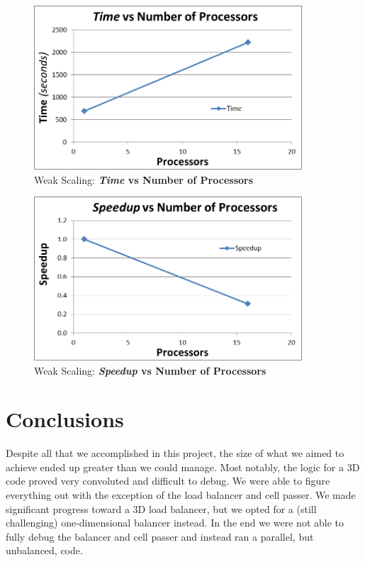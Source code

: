 \documentclass[]{article}
\begin{document}
\begin{figure}[h!]
    \centering
    \includegraphics[width=10cm]{weak_times.png}
    \caption{Weak Scaling: \textbf{\textit{Time} vs Number of Processors}}
\end{figure}

\begin{figure}[h!]
    \centering
    \includegraphics[width=10cm]{weak_speedup.png}
    \caption{Weak Scaling: \textbf{\textit{Speedup} vs Number of Processors}}
\end{figure}



\newpage

\section{Conclusions}
Despite all that we accomplished in this project, the size of what we aimed to achieve ended up greater than we could manage. Most notably, the logic for a 3D code proved very convoluted and difficult to debug.  We were able to figure everything out with the exception of the load balancer and cell passer.  We made significant progress toward a 3D load balancer, but we opted for a (still challenging) one-dimensional balancer instead.  In the end we were not able to fully debug the balancer and cell passer and instead ran a parallel, but unbalanced, code.
\end{document}
